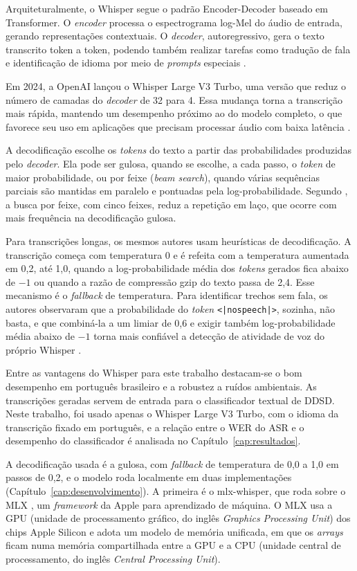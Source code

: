 \documentclass[
    12pt,                %
    openright,           %
    oneside,             %
    a4paper,             %
    english,             %
    brazil               %
]{abntex2}
\begin{document}
Arquiteturalmente, o Whisper segue o padrão Encoder-Decoder baseado em Transformer. O \textit{encoder} processa o espectrograma log-Mel do áudio de entrada, gerando representações contextuais. O \textit{decoder}, autoregressivo, gera o texto transcrito token a token, podendo também realizar tarefas como tradução de fala e identificação de idioma por meio de \textit{prompts} especiais \cite{Radford2023}.

Em 2024, a OpenAI lançou o Whisper Large V3 Turbo, uma versão que reduz o número de camadas do \textit{decoder} de 32 para 4. Essa mudança torna a transcrição mais rápida, mantendo um desempenho próximo ao do modelo completo, o que favorece seu uso em aplicações que precisam processar áudio com baixa latência \cite{OpenAI2024Turbo}.

A decodificação escolhe os \textit{tokens} do texto a partir das probabilidades produzidas pelo \textit{decoder}. Ela pode ser gulosa, quando se escolhe, a cada passo, o \textit{token} de maior probabilidade, ou por feixe (\textit{beam search}), quando várias sequências parciais são mantidas em paralelo e pontuadas pela log-probabilidade. Segundo , a busca por feixe, com cinco feixes, reduz a repetição em laço, que ocorre com mais frequência na decodificação gulosa.

Para transcrições longas, os mesmos autores usam heurísticas de decodificação. A transcrição começa com temperatura 0 e é refeita com a temperatura aumentada em 0,2, até 1,0, quando a log-probabilidade média dos \textit{tokens} gerados fica abaixo de $-1$ ou quando a razão de compressão gzip do texto passa de 2,4. Esse mecanismo é o \textit{fallback} de temperatura. Para identificar trechos sem fala, os autores observaram que a probabilidade do \textit{token} \texttt{<|nospeech|>}, sozinha, não basta, e que combiná-la a um limiar de 0,6 e exigir também log-probabilidade média abaixo de $-1$ torna mais confiável a detecção de atividade de voz do próprio Whisper \cite{Radford2023}.

Entre as vantagens do Whisper para este trabalho destacam-se o bom desempenho em português brasileiro e a robustez a ruídos ambientais. As transcrições geradas servem de entrada para o classificador textual de DDSD. Neste trabalho, foi usado apenas o Whisper Large V3 Turbo, com o idioma da transcrição fixado em português, e a relação entre o WER do ASR e o desempenho do classificador é analisada no Capítulo~\ref{cap:resultados}.

A decodificação usada é a gulosa, com \textit{fallback} de temperatura de 0,0 a 1,0 em passos de 0,2, e o modelo roda localmente em duas implementações (Capítulo~\ref{cap:desenvolvimento}). A primeira é o mlx-whisper, que roda sobre o MLX \cite{MLX2023}, um \textit{framework} da Apple para aprendizado de máquina. O MLX usa a GPU (unidade de processamento gráfico, do inglês \textit{Graphics Processing Unit}) dos chips Apple Silicon e adota um modelo de memória unificada, em que os \textit{arrays} ficam numa memória compartilhada entre a GPU e a CPU (unidade central de processamento, do inglês \textit{Central Processing Unit}).
\end{document}
